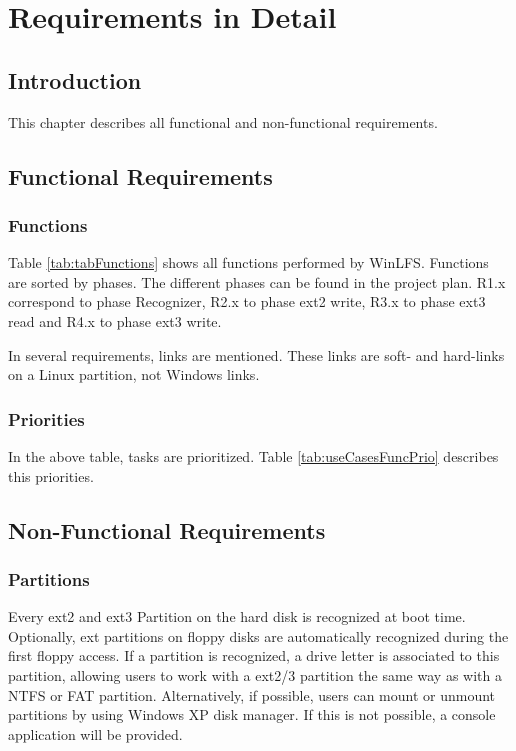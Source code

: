 \chapter{Requirements in Detail}
\label{cha:requirementsInDetail}

\section{Introduction}
This chapter describes all functional and non-functional requirements.

\section{Functional Requirements}
\subsection{Functions}
Table \ref{tab:tabFunctions} shows all functions performed by WinLFS. Functions are sorted by phases. The different phases can be found in the project plan. R1.x correspond to phase Recognizer, R2.x to phase ext2 write, R3.x to phase ext3 read and R4.x to phase ext3 write. 

In several requirements, links are mentioned. These links are soft- and hard-links on a Linux partition, not Windows links.

\subsection{Priorities}
In the above table, tasks are prioritized. Table \ref{tab:useCasesFuncPrio} describes this priorities.


\section{Non-Functional Requirements}

\subsection{Partitions}
Every ext2 and ext3 Partition on the hard disk is recognized at boot time. Optionally, ext partitions on floppy disks are automatically recognized during the first floppy access. If a partition is recognized, a drive letter is associated to this partition, allowing users to work with a ext2/3 partition the same way as with a NTFS or FAT partition. Alternatively, if possible, users can mount or unmount partitions by using Windows XP disk manager. If this is not possible, a console application will be provided.

